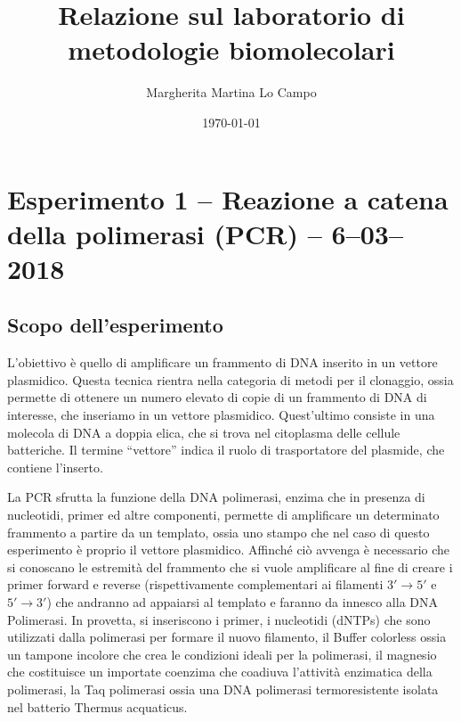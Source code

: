 \documentclass[twocolumn,a4paper,10pt]{my_report}
\title{Relazione sul laboratorio di metodologie biomolecolari}
\author{Margherita Martina Lo Campo}
\date{\today}
\begin{document}

\section{Esperimento 1 -- Reazione a catena della polimerasi (PCR) -- 6--03--2018}

\subsection{Scopo dell’esperimento}
L'obiettivo è quello di amplificare un frammento di DNA inserito in un vettore plasmidico.
Questa tecnica rientra nella categoria di metodi per il clonaggio, ossia permette di ottenere un numero elevato di copie di un frammento di DNA di interesse, che inseriamo in un vettore plasmidico.
Quest’ultimo consiste in una molecola di DNA a doppia elica, che si trova nel citoplasma delle cellule batteriche.
Il termine ``vettore'' indica il ruolo di trasportatore del plasmide, che contiene l'inserto.

La PCR sfrutta la funzione della DNA polimerasi, enzima che in presenza di nucleotidi, primer ed altre componenti, permette di amplificare un determinato frammento a partire da un templato, ossia uno stampo che nel caso di questo esperimento è proprio il vettore plasmidico.
Affinché ciò avvenga è necessario che si conoscano le estremità del frammento che si vuole amplificare al fine di creare i primer forward e reverse (rispettivamente complementari ai filamenti $3' \rightarrow 5'$ e $5' \rightarrow 3'$) che andranno ad appaiarsi al templato e faranno da innesco alla DNA Polimerasi.
In provetta, si inseriscono i primer, i nucleotidi (dNTPs) che sono utilizzati dalla polimerasi per formare il nuovo filamento, il Buffer colorless ossia un tampone incolore che crea le condizioni ideali per la polimerasi, il magnesio che costituisce un importate coenzima che coadiuva l’attività enzimatica della polimerasi, la Taq polimerasi ossia una DNA polimerasi termoresistente isolata nel batterio Thermus acquaticus.
\end{document}
